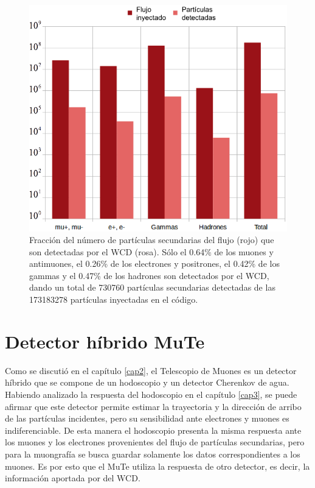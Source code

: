 \documentclass[12pt,oneside,openany,letter]{book}
\begin{document}
\begin{figure}[h]
\centering
\includegraphics[scale=0.6]{inyectadas_enelWCD.png}
\caption[Fracción del número de partículas secundarias del flujo que detecta el WCD]{Fracción del número de partículas secundarias del flujo (rojo) que son detectadas por el WCD (rosa). Sólo el 0.64\% de los muones y antimuones, el 0.26\% de los electrones y positrones, el 0.42\% de los gammas y el 0.47\% de los hadrones son detectados por el WCD, dando un total de 730760 partículas secundarias detectadas de las 173183278 partículas inyectadas en el código.
\label{inyectadas_enelWCD} }
\end{figure}



\chapter{Detector híbrido MuTe}\label{cap5}
Como se discutió en el capítulo \ref{cap2}, el Telescopio de Muones es un detector híbrido que se compone de un hodoscopio y un detector Cherenkov de agua. Habiendo analizado la respuesta del hodoscopio en el capítulo \ref{cap3}, se puede afirmar que este detector permite estimar la trayectoria y la dirección de arribo de las partículas incidentes, pero su sensibilidad ante electrones y muones es indiferenciable. De esta manera el hodoscopio presenta la misma respuesta ante los muones y los electrones provenientes del flujo de partículas secundarias, pero para la muongrafía se busca guardar solamente los datos correspondientes a los muones. Es por esto que el MuTe utiliza la respuesta de otro detector, es decir, la información aportada por del WCD. 
\end{document}
